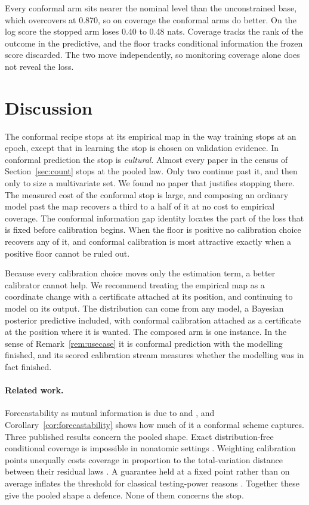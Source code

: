 \documentclass[11pt]{article}
\theoremstyle{remark}
\begin{document}
Every conformal arm sits nearer the nominal level than the unconstrained base,
which overcovers at 0.870, so on coverage the conformal arms do better. On the log
score the stopped arm loses 0.40 to 0.48 nats. Coverage tracks the rank of the
outcome in the predictive, and the floor tracks conditional information the frozen
score discarded. The two move independently, so monitoring coverage alone does not
reveal the loss.

\section{Discussion}\label{sec:discussion}

The conformal recipe stops at its empirical map in the way training stops at an
epoch, except that in learning the stop is chosen on validation evidence. In
conformal prediction the stop is \emph{cultural}. Almost every paper in the census
of Section~\ref{sec:count} stops at the pooled law. Only two continue past it, and
then only to size a multivariate set. We found no paper that justifies stopping
there. The
measured cost of the conformal stop is large, and composing an ordinary model past
the map recovers a third to a half of it at no cost to empirical coverage. The
conformal information gap identity locates the part of the loss that is fixed
before calibration begins. When the floor is positive no calibration choice
recovers any of it, and conformal calibration is most attractive exactly when a
positive floor cannot be ruled out.

Because every calibration choice moves only the estimation term, a better
calibrator cannot help. We recommend treating the empirical map as a coordinate
change with a certificate attached at its position, and continuing to model on its
output. The distribution can come from any model, a Bayesian posterior predictive
included, with conformal calibration attached as a certificate at the position where
it is wanted. The composed arm is one instance. In the sense of
Remark~\ref{rem:usecase} it is conformal prediction with the modelling finished,
and its scored calibration stream measures whether the modelling was in fact
finished.

\paragraph{Related work.} Forecastability as mutual information is due to
\citet{delsole2004} and \citet{catt2026}, and Corollary~\ref{cor:forecastability}
shows how much of it a conformal scheme captures. Three published results concern the pooled shape. Exact distribution-free
conditional coverage is impossible in nonatomic settings
\citep{lei2014distribution,barber2021limits}. Weighting calibration points unequally
costs coverage in proportion to the total-variation distance between their residual
laws \citep{barber2023beyond}. A guarantee held at a fixed point rather than on
average inflates the threshold for classical testing-power reasons
\citep{li1989honest,low1997nonparametric,cai2004adaptation}. Together these give the
pooled shape a defence. None of them concerns the stop.
\end{document}
